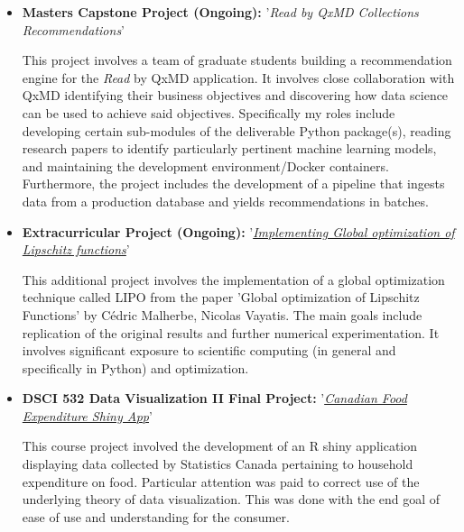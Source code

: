 \documentclass[11pt,a4paper,sans]{moderncv}        %
\begin{document}
\begin{itemize}

\item{\textbf{Masters Capstone Project (Ongoing):} '\textit{Read by QxMD Collections Recommendations}'

\vspace{3pt}

\small{This project involves a team of graduate students building a recommendation engine 
for the \textit{Read} by QxMD application. It involves close collaboration with QxMD identifying 
their business objectives and discovering how data science can be used to achieve said 
objectives. Specifically my roles include developing certain sub-modules of the deliverable 
Python package(s), reading research papers to identify particularly pertinent machine learning models, and maintaining the development environment/Docker containers. 
Furthermore, the project includes the development of a pipeline that ingests data from 
a production database and yields recommendations in batches.}}

\vspace{6pt}

\item{\textbf{Extracurricular Project (Ongoing):} '\textit{\href{https://github.com/UBC-CS/lipo-python}{Implementing Global optimization of Lipschitz functions}}'

\vspace{3pt}

\small{This additional project involves the implementation of a global optimization technique 
called LIPO from the paper 'Global optimization of Lipschitz Functions' by Cédric Malherbe, Nicolas Vayatis. The main goals include replication of the original results and further 
numerical experimentation. It involves significant exposure to scientific
computing (in general and specifically in Python) and optimization.}}

\vspace{6pt}

\item{\textbf{DSCI 532 Data Visualization II Final Project:} '\textit{\href{https://github.com/bradleypick/food-expenditure}{Canadian Food Expenditure Shiny App}}'

\vspace{3pt}

\small{This course project involved the development of an R shiny application displaying data 
collected by Statistics Canada pertaining to household expenditure on food. Particular 
attention was paid to correct use of the underlying theory of data visualization. This 
was done with the end goal of ease of use and understanding for the consumer.}}


\end{itemize}
\end{document}

